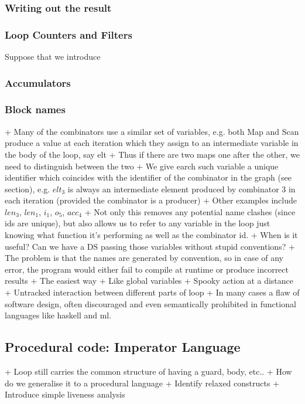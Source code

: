 \subsubsection{Writing out the result}


\subsubsection{Loop Counters and Filters}

Suppose that we introduce



\subsubsection{Accumulators}



\subsubsection{Block names}



+ Many of the combinators use a similar set of variables, e.g. both Map and Scan produce a value at each iteration which they assign to an intermediate variable in the body of the loop, say elt
+ Thus if there are two maps one after the other, we need to distinguish between the two
+ We give earch such variable a unique identifier which coincides with the identifier of the combinator in the graph (see section), e.g. $elt_3$ is always an intermediate element produced by combinator 3 in each iteration (provided the combinator is a producer)
+ Other examples include $len_3$, $len_1$, $i_1$, $o_5$, $acc_4$
+ Not only this removes any potential name clashes (since ids are unique), but also allows us to refer to any variable in the loop just knowing what function it's performing as well as the combinator id.
+ When is it useful? Can we have a DS passing those variables without stupid conventions?
+ The problem is that the names are generated by convention, so in case of any error, the program would either fail to compile at runtime or produce incorrect results
+ The easiest way 
+ Like global variables
+ Spooky action at a distance
+ Untracked interaction between different parts of loop
+ In many cases a flaw of software design, often discouraged and even semantically prohibited in functional languages like haskell and ml.



\subsection{Procedural code: Imperator Language}

+ Loop still carries the common structure of having a guard, body, etc..
+ How do we generalise it to a procedural language
+ Identify relaxed constructs
+ Introduce simple liveness analysis


